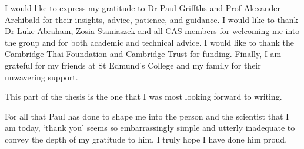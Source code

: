 
\begin{acknowledgements}      



I would like to express my gratitude to Dr Paul Griffths and Prof Alexander Archibald for their insights, advice, patience, and guidance. I would like to thank Dr Luke Abraham, Zosia Staniaszek and all CAS members for welcoming me into the group and for both academic and technical advice. I would like to thank the Cambridge Thai Foundation and Cambridge Trust for funding. Finally, I am grateful for my friends at St Edmund’s College and my family for their unwavering support.


This part of the thesis is the one that I was most looking forward to writing.

For all that Paul has done to shape me into the person and the scientist that I am today, ‘thank you’ seems so embarrassingly simple and utterly inadequate to convey the depth of my gratitude to him. I truly hope I have done him proud.

\end{acknowledgements}
